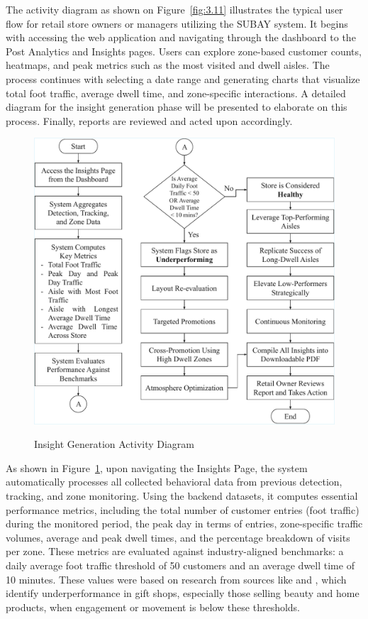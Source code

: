 {The activity diagram as shown on Figure~\ref{fig:3.11} illustrates the typical user flow for retail store owners or managers utilizing the SUBAY system. It begins with accessing the web application and navigating through the dashboard to the Post Analytics and Insights pages. Users can explore zone-based customer counts, heatmaps, and peak metrics such as the most visited and dwell aisles. The process continues with selecting a date range and generating charts that visualize total foot traffic, average dwell time, and zone-specific interactions. A detailed diagram for the insight generation phase will be presented to elaborate on this process. Finally, reports are reviewed and acted upon accordingly.

\begin{figure}[H]
	\caption[Insight Generation Activity Diagram]{\newline \newline Insight Generation Activity Diagram}
	\centering
	\includegraphics[width=0.80\linewidth]{fig/3.12.pdf}
	\label{fig:3.12}
\end{figure}

As shown in Figure~\ref{fig:3.12}, upon navigating the Insights Page, the system automatically processes all collected behavioral data from previous detection, tracking, and zone monitoring. Using the backend datasets, it computes essential performance metrics, including the total number of customer entries (foot traffic) during the monitored period, the peak day in terms of entries, zone-specific traffic volumes, average and peak dwell times, and the percentage breakdown of visits per zone. These metrics are evaluated against industry-aligned benchmarks: a daily average foot traffic threshold of 50 customers and an average dwell time of 10 minutes. These values were based on research from sources like \cite{BPlanAI2025} and \cite{CountTrack2025}, which identify underperformance in gift shops, especially those selling beauty and home products, when engagement or movement is below these thresholds.

}
